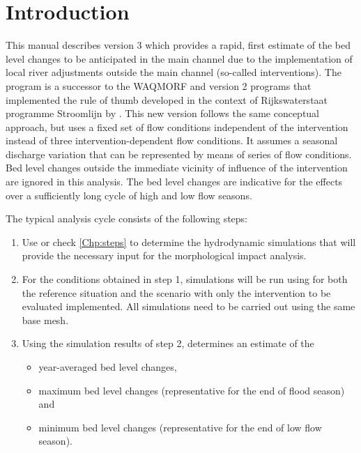 \chapter{Introduction}

This manual describes \dfastmi version 3 which provides a rapid, first estimate of the bed level changes to be anticipated in the main channel due to the implementation of local river adjustments outside the main channel (so-called interventions).
The program is a successor to the WAQMORF and \dfastmi version 2 programs that implemented the rule of thumb developed in the context of Rijkswaterstaat programme Stroomlijn by \citep{Sieben2008}.
This new version follows the same conceptual approach, but uses a fixed set of flow conditions independent of the intervention instead of three intervention-dependent flow conditions.
It assumes a seasonal discharge variation that can be represented by means of series of flow conditions.
Bed level changes outside the immediate vicinity of influence of the intervention are ignored in this analysis.
The bed level changes are indicative for the effects over a sufficiently long cycle of high and low flow seasons.

The typical analysis cycle consists of the following steps:

\begin{enumerate}
\item Use \dfastmi or check \autoref{Chp:steps} to determine the hydrodynamic simulations that will provide the necessary input for the morphological impact analysis.

\item For the conditions obtained in step 1, simulations will be run using \dflowfm for both the reference situation and the scenario with only the intervention to be evaluated implemented.
All simulations need to be carried out using the same base mesh.

\item Using the simulation results of step 2, \dfastmi determines an estimate of the
\begin{itemize}
\item year-averaged bed level changes,
\item maximum bed level changes (representative for the end of flood season) and
\item minimum bed level changes (representative for the end of low flow season).
\end{itemize}
\end{enumerate}

